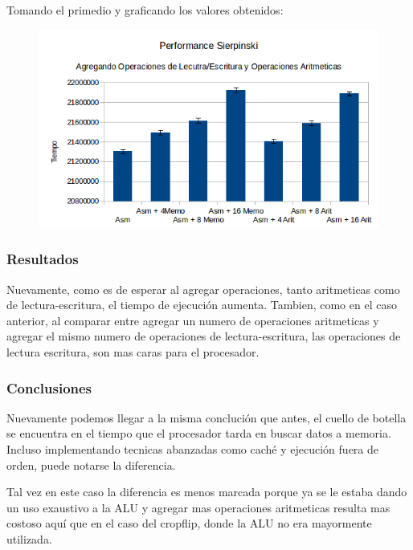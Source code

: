 \documentclass[a4paper]{article}
\begin{document}
Tomando el primedio y graficando los valores obtenidos:

\begin{figure}[h!]
  \begin{center}
  \includegraphics[scale=0.66]{Graficos1.5/sie/per.png}
  \label{nombreparareferenciar1}
  \end{center}
\end{figure}

\subsubsection{Resultados}
Nuevamente, como es de esperar al agregar operaciones, tanto aritmeticas como de lectura-escritura, el tiempo de ejecución aumenta. Tambien, como en el caso anterior, al comparar entre agregar un numero de operaciones aritmeticas y agregar el mismo numero de operaciones de lectura-escritura, las operaciones de lectura escritura, son mas caras para el procesador.

\subsubsection{Conclusiones}

Nuevamente podemos llegar a la misma conclución que antes, el cuello de botella se encuentra en el tiempo que el procesador tarda en buscar datos a memoria. Incluso implementando tecnicas abanzadas como caché y ejecución fuera de orden, puede notarse la diferencia. 

Tal vez en este caso la diferencia es menos marcada porque ya se le estaba dando un uso exaustivo a la ALU y agregar mas operaciones aritmeticas resulta mas costoso aquí que en el caso del cropflip, donde la ALU no era mayormente utilizada.
\end{document}
